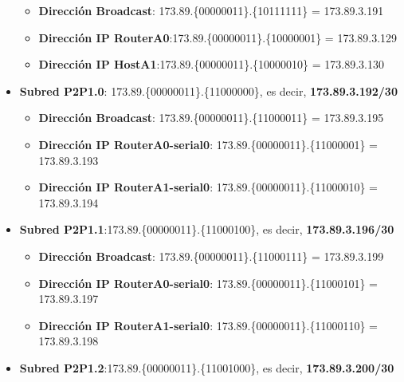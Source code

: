\begin{itemize}
		\begin{itemize}
			\item{\textbf{Dirección Broadcast}}: 173.89.\{\textcolor{azul}{000000}\textcolor{rojo}{11}\}.\{\textcolor{rojo}{10}111111\} = 173.89.3.191
			\item{\textbf{Dirección IP RouterA0}}:173.89.\{\textcolor{azul}{000000}\textcolor{rojo}{11}\}.\{\textcolor{rojo}{10}000001\} = 173.89.3.129
			\item{\textbf{Dirección IP HostA1}}:173.89.\{\textcolor{azul}{000000}\textcolor{rojo}{11}\}.\{\textcolor{rojo}{10}000010\} = 173.89.3.130
		\end{itemize}
	\item{\textbf{Subred P2P1.0}:} 173.89.\{\textcolor{azul}{000000}\textcolor{rojo}{11}\}.\{\textcolor{rojo}{110000}00\}, es decir, \textbf{173.89.3.192/30}
		\begin{itemize}
			\item{\textbf{Dirección Broadcast}}: 173.89.\{\textcolor{azul}{000000}\textcolor{rojo}{11}\}.\{\textcolor{rojo}{110000}11\} = 173.89.3.195
			\item{\textbf{Dirección IP RouterA0-serial0}}: 173.89.\{\textcolor{azul}{000000}\textcolor{rojo}{11}\}.\{\textcolor{rojo}{110000}01\} = 173.89.3.193
			\item{\textbf{Dirección IP RouterA1-serial0}}: 173.89.\{\textcolor{azul}{000000}\textcolor{rojo}{11}\}.\{\textcolor{rojo}{110000}10\} = 173.89.3.194
		\end{itemize}
	\item{\textbf{Subred P2P1.1}:}173.89.\{\textcolor{azul}{000000}\textcolor{rojo}{11}\}.\{\textcolor{rojo}{110001}00\}, es decir, \textbf{173.89.3.196/30}
		\begin{itemize}
			\item{\textbf{Dirección Broadcast}}: 173.89.\{\textcolor{azul}{000000}\textcolor{rojo}{11}\}.\{\textcolor{rojo}{110001}11\} = 173.89.3.199
			\item{\textbf{Dirección IP RouterA0-serial0}}: 173.89.\{\textcolor{azul}{000000}\textcolor{rojo}{11}\}.\{\textcolor{rojo}{110001}01\} = 173.89.3.197
			\item{\textbf{Dirección IP RouterA1-serial0}}: 173.89.\{\textcolor{azul}{000000}\textcolor{rojo}{11}\}.\{\textcolor{rojo}{110001}10\} = 173.89.3.198
		\end{itemize}
	\item{\textbf{Subred P2P1.2}:}173.89.\{\textcolor{azul}{000000}\textcolor{rojo}{11}\}.\{\textcolor{rojo}{110010}00\}, es decir, \textbf{173.89.3.200/30}

\end{itemize}
